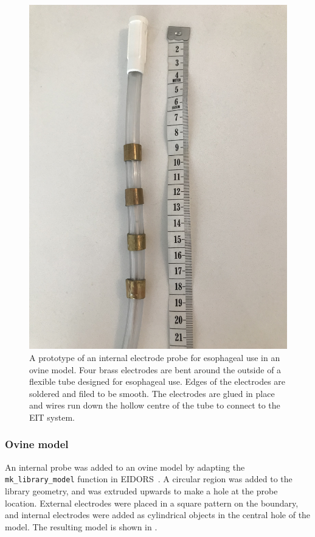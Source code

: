 \begin{figure}
    \centering
	\includegraphics[width=\textwidth, angle =-90]{chapter7-internal_elec_motion/imgs/probe_prototype.jpg} 
	\caption[Probe prototype]{\label{fig:probe_design} 
	A prototype of an internal electrode probe for esophageal use in an ovine model.
	Four brass electrodes are bent around the outside of a flexible tube designed for
	esophageal use. Edges of the electrodes are soldered and filed to be smooth. 
	The electrodes are glued in place and wires run down the hollow centre
	of the tube to connect to the EIT system.}
 \end{figure}

\subsubsection{Ovine model}
An internal probe was added to an ovine model by adapting the 
\verb!mk_library_model!
function in EIDORS~\parencite{adler_eidors_2017}. A circular region was added to the
library geometry, and was extruded upwards to make a hole at the probe location. 
External electrodes were placed in a square pattern on the boundary, and internal
electrodes were added as cylindrical objects in the central hole of the model.
The resulting model is shown in .

